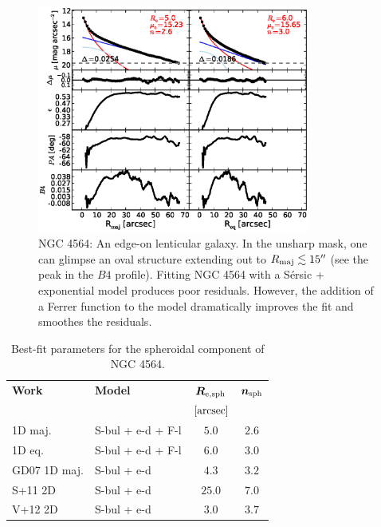 \documentclass[preprint2]{emulateapj}
\newcommand{\fitfigurewidth}{0.8\textwidth}
\begin{document}
  \begin{figure}[h]
  \begin{center}
  \includegraphics[width=\fitfigurewidth]{images/n4564_1Dfit.eps}
  \caption{NGC 4564: 
  An edge-on lenticular galaxy.
  In the unsharp mask, one can glimpse an oval structure extending out to $R_{\rm maj} \lesssim 15''$ (see the peak in the $B4$ profile).
  Fitting NGC 4564 with a S\'ersic + exponential model produces poor residuals.
  However, the addition of a Ferrer function to the model dramatically improves the fit and smoothes the residuals.
  }
  \end{center}
  \end{figure}

  \begin{table}[h]
  \small
  \caption{Best-fit parameters for the spheroidal component of NGC 4564.}
  \begin{center}
  \begin{tabular}{llcc}
  \hline
  {\bf Work} & {\bf Model}   & $\bm R_{\rm e,sph}$    & $\bm n_{\rm sph}$ \\
    &  &  $[\rm arcsec]$ & \\
  \hline
  1D maj. & S-bul + e-d + F-l & $5.0$  &  $2.6$ \\
  1D eq.  & S-bul + e-d + F-l & $6.0$  &  $3.0$ \\
  \hline
  GD07 1D maj.      & S-bul + e-d & $4.3$  &  $3.2$ \\
  S+11 2D      & S-bul + e-d & $25.0$ &  $7.0$ \\
  V+12 2D      & S-bul + e-d & $3.0$  &  $3.7$ \\
  \hline
  \end{tabular}
  \end{center}
  \label{tab:n4564}
  \end{table}
\end{document}
